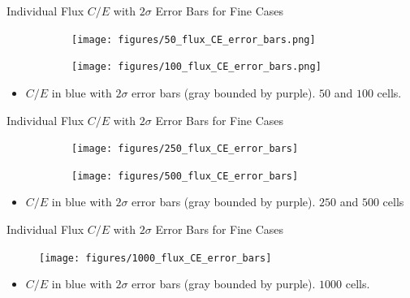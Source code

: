 \documentclass[9pt,t,aspectratio=169]{beamer}
\begin{document}
\begin{frame}{Individual Flux $C/E$ with $2\sigma$ Error Bars for Fine Cases}
    \vspace*{-0.35cm}
    \begin{figure}[T]
        \hspace*{-0.3cm}
        \begin{subfigure}{0.495\textwidth}
            \texttt{[image: figures/50\_flux\_CE\_error\_bars.png]}
        \end{subfigure}\hspace*{0.5cm}
        \begin{subfigure}{0.495\textwidth}
            \texttt{[image: figures/100\_flux\_CE\_error\_bars.png]}
        \end{subfigure}
    \end{figure}
    \vspace*{-0.15cm}
    \begin{itemize}
        \item $C/E$ in blue with $2\sigma$ error bars (gray bounded by purple). $50$ and $100$ cells.
    \end{itemize}
\end{frame}

\begin{frame}{Individual Flux $C/E$ with $2\sigma$ Error Bars for Fine Cases}
    \vspace*{-0.35cm}
    \begin{figure}[T]
        \hspace*{-0.3cm}
        \begin{subfigure}{0.495\textwidth}
            \texttt{[image: figures/250\_flux\_CE\_error\_bars]}
        \end{subfigure}\hspace*{0.5cm}
        \begin{subfigure}{0.495\textwidth}
            \texttt{[image: figures/500\_flux\_CE\_error\_bars]}
        \end{subfigure}
    \end{figure}
    \vspace*{-0.15cm}
    \begin{itemize}
        \item $C/E$ in blue with $2\sigma$ error bars (gray bounded by purple). $250$ and $500$ cells
    \end{itemize}
\end{frame}

\begin{frame}{Individual Flux $C/E$ with $2\sigma$ Error Bars for Fine Cases}
    \vspace*{-0.35cm}
    \begin{figure}[T]
        \centering
        \texttt{[image: figures/1000\_flux\_CE\_error\_bars]}
    \end{figure}
    \begin{itemize}
        \item $C/E$ in blue with $2\sigma$ error bars (gray bounded by purple). $1000$ cells.
    \end{itemize}
\end{frame}
\end{document}
